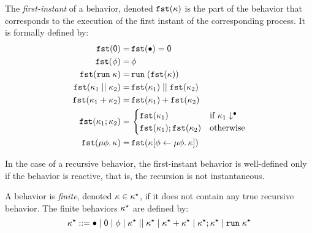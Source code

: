 \documentclass[9pt,preprint]{sigplanconf}
\newcommand{\todo}[1]{ {\color{red} #1}}
\newcommand{\sdeq}{::=}
\begin{document}
\begin{definition}
The \emph{first-instant} of a behavior, denoted $\mathtt{fst}(\kappa)$ is the part of the behavior that corresponds to the execution of the first instant of the corresponding process. It is formally defined by:
\begin{align*}
\mathtt{fst}(\textsf{0}) =&\, \mathtt{fst}(\bullet)  = \textsf{0} \\
\mathtt{fst}(\phi) =&\, \phi \\
\mathtt{fst}(\mathtt{run}\; \kappa) =&\, \mathtt{run}\; (\mathtt{fst}(\kappa)) \\ 
\mathtt{fst}(\kappa_1 \mid\mid \kappa_2) =&\, \mathtt{fst}(\kappa_1) \mid\mid \mathtt{fst}(\kappa_2) \\
\mathtt{fst}(\kappa_1 + \kappa_2) =&\, \mathtt{fst}(\kappa_1) + \mathtt{fst}(\kappa_2) \\
\mathtt{fst}(\kappa_1 ; \kappa_2) =&\, 
		\begin{cases}
			\mathtt{fst}(\kappa_1) & \text{if } \kappa_1\downarrow^{\bullet} \\
			\mathtt{fst}(\kappa_1) ; \mathtt{fst}(\kappa_2) &\text{otherwise} 
		\end{cases} \\
\mathtt{fst}(\mu \phi.\, \kappa) =&\, \mathtt{fst}(\kappa[\phi \leftarrow \mu \phi.\, \kappa])
\end{align*}
\end{definition}
In the case of a recursive behavior,  the first-instant behavior is well-defined only if the behavior is reactive, that is, the recursion is not instantaneous.

\begin{definition}
A behavior is \emph{finite}, denoted $\kappa \in \kappa^{\star}$, if it does not contain any true recursive behavior. The finite behaviors $\kappa^{\star}$ are defined by: 
\[
\rkf \sdeq \effplus \mid \effmin \mid \effvar \mid \effpar{\rkf}{\rkf} \mid \effor{\rkf}{\rkf}
\mid \effcon{\rkf}{\rkf}  \mid \effrun{\rkf}
\]
\end{definition}
\end{document}
